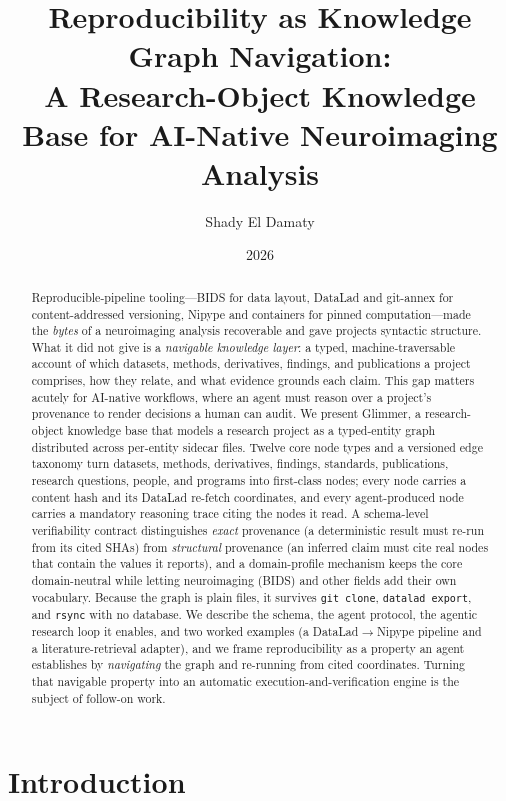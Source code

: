 \documentclass[preprint]{glimmer-paper}
\title{Reproducibility as Knowledge Graph Navigation:\\
A Research-Object Knowledge Base for AI-Native Neuroimaging Analysis}
\author{Shady El Damaty}
\affil{Holonym / Opscientia}
\date{2026}
\newcommand{\code}[1]{\texttt{#1}}
\begin{document}
\maketitle

\begin{abstract}
Reproducible-pipeline tooling---BIDS for data layout, DataLad and git-annex for
content-addressed versioning, Nipype and containers for pinned computation---made the
\emph{bytes} of a neuroimaging analysis recoverable and gave projects syntactic
structure. What it did not give is a \emph{navigable knowledge layer}: a typed,
machine-traversable account of which datasets, methods, derivatives, findings, and
publications a project comprises, how they relate, and what evidence grounds each claim.
This gap matters acutely for AI-native workflows, where an agent must reason over a
project's provenance to render decisions a human can audit. We present Glimmer, a
research-object knowledge base that models a research project as a typed-entity graph
distributed across per-entity sidecar files. Twelve core node types and a versioned edge
taxonomy turn datasets, methods, derivatives, findings, standards, publications, research
questions, people, and programs into first-class nodes; every node carries a content hash
and its DataLad re-fetch coordinates, and every agent-produced node carries a mandatory
reasoning trace citing the nodes it read. A schema-level verifiability contract
distinguishes \emph{exact} provenance (a deterministic result must re-run from its cited
SHAs) from \emph{structural} provenance (an inferred claim must cite real nodes that
contain the values it reports), and a domain-profile mechanism keeps the core
domain-neutral while letting neuroimaging (BIDS) and other fields add their own
vocabulary. Because the graph is plain files, it survives \code{git clone},
\code{datalad export}, and \code{rsync} with no database. We describe the schema, the
agent protocol, the agentic research loop it enables, and two worked examples (a
DataLad$\rightarrow$Nipype pipeline and a literature-retrieval adapter), and we frame
reproducibility as a property an agent establishes by \emph{navigating} the graph and
re-running from cited coordinates. Turning that navigable property into an automatic
execution-and-verification engine is the subject of follow-on work.
\end{abstract}

\section{Introduction}
\end{document}
